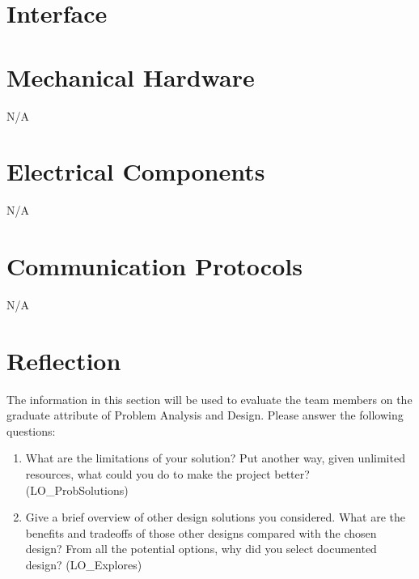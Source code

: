 \documentclass[12pt, titlepage]{article}
\begin{document}
% 

\newpage{}

\appendix

\section{Interface}


\section{Mechanical Hardware}
N/A
\section{Electrical Components}
N/A
\section{Communication Protocols}
N/A
\section{Reflection}

The information in this section will be used to evaluate the team members on the
graduate attribute of Problem Analysis and Design.  Please answer the following questions:

\begin{enumerate}
  \item What are the limitations of your solution?  Put another way, given
  unlimited resources, what could you do to make the project better? (LO\_ProbSolutions)
  \item Give a brief overview of other design solutions you considered.  What
  are the benefits and tradeoffs of those other designs compared with the chosen
  design?  From all the potential options, why did you select documented design?
  (LO\_Explores)
\end{enumerate}
\end{document}
